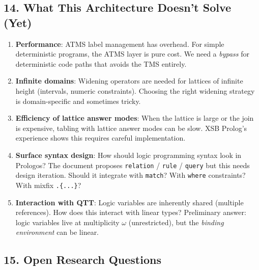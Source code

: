 \documentclass[11pt]{article}
\begin{document}
\subsection{14. What This Architecture Doesn't Solve (Yet)}
\label{sec:org9fa9c18}

\begin{enumerate}
\item \textbf{Performance}: ATMS label management has overhead. For simple
deterministic programs, the ATMS layer is pure cost. We need a
\emph{bypass} for deterministic code paths that avoids the TMS entirely.

\item \textbf{Infinite domains}: Widening operators are needed for lattices of
infinite height (intervals, numeric constraints). Choosing the right
widening strategy is domain-specific and sometimes tricky.

\item \textbf{Efficiency of lattice answer modes}: When the lattice is large or
the join is expensive, tabling with lattice answer modes can be slow.
XSB Prolog's experience shows this requires careful implementation.

\item \textbf{Surface syntax design}: How should logic programming syntax look in
Prologos? The document proposes \texttt{relation} / \texttt{rule} / \texttt{query} but
this needs design iteration. Should it integrate with \texttt{match}? With
\texttt{where} constraints? With mixfix \texttt{.\{...\}}?

\item \textbf{Interaction with QTT}: Logic variables are inherently shared
(multiple references). How does this interact with linear types?
Preliminary answer: logic variables live at multiplicity \(\omega\)
(unrestricted), but the \emph{binding environment} can be linear.
\end{enumerate}
\subsection{15. Open Research Questions}
\label{sec:org473d69f}
\end{document}
